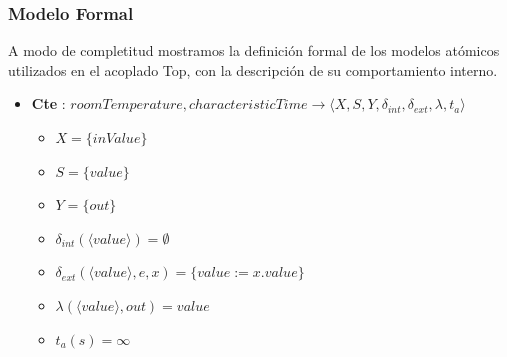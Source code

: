 \subsubsection{Modelo Formal}
A modo de completitud mostramos la definición formal de los modelos atómicos 
utilizados en el acoplado Top, con la descripción de su comportamiento interno.
\begin{itemize}

\item \textbf{Cte} : $ roomTemperature, characteristicTime \rightarrow \langle X, S, Y, \delta_{int}, \delta_{ext}, \lambda, t_{a} \rangle$ \newline
\begin{itemize}
	\item $ X = \{ inValue \} $ \newline
	\item $ S = \{ value \} $ \newline
	\item $ Y = \{ out \} $ \newline
	\item $ \delta_{int}(\langle value \rangle) = \emptyset $ \newline
	\item $ \delta_{ext} (\langle value \rangle, e, x)= \{ value := x.value \} $ \newline
	\item $ \lambda(\langle value \rangle, out) = value $ \newline
	\item $ t_{a}(s) = \infty $ 
\end{itemize}


\end{itemize}
